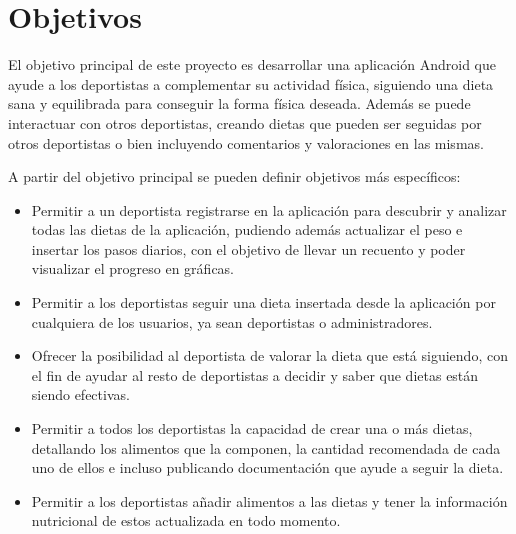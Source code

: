 \section{Objetivos}
El objetivo principal de este proyecto es desarrollar una aplicación Android que ayude a los deportistas a complementar su actividad física, siguiendo una dieta sana y equilibrada para conseguir la forma física deseada. Además se puede interactuar con otros deportistas, creando dietas que pueden ser seguidas por otros deportistas o bien incluyendo comentarios y valoraciones en las mismas.

A partir del objetivo principal se pueden definir objetivos más específicos:
\begin{itemize}
    \item Permitir a un deportista registrarse en la aplicación para descubrir y analizar todas las dietas de la aplicación, pudiendo además actualizar el peso e insertar los pasos diarios, con el objetivo de llevar un recuento y poder visualizar el progreso en gráficas.
    \item Permitir a los deportistas seguir una dieta insertada desde la aplicación por cualquiera de los usuarios, ya sean deportistas o administradores.
    \item Ofrecer la posibilidad al deportista de valorar la dieta que está siguiendo, con el fin de ayudar al resto de deportistas a decidir y saber que dietas están siendo efectivas.
    \item Permitir a todos los deportistas la capacidad de crear una o más dietas, detallando los alimentos que la componen, la cantidad recomendada de cada uno de ellos e incluso publicando documentación que ayude a seguir la dieta.
    \item Permitir a los deportistas añadir alimentos a las dietas y tener la información nutricional de estos actualizada en todo momento.
\end{itemize}